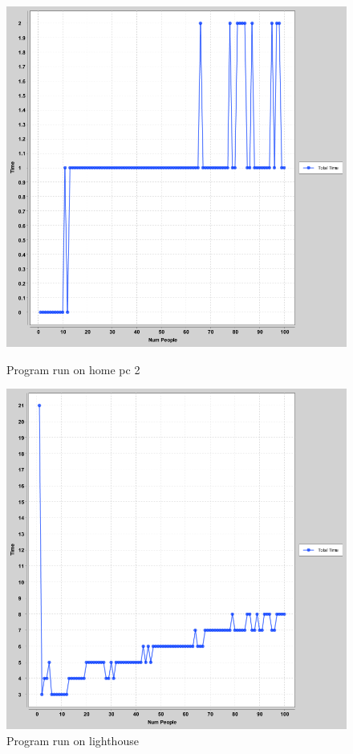 \documentclass[a4paper, 12pt]{article}
\begin{document}
		\begin{figure}[H]
  				\includegraphics[width=\linewidth]{numpeople-vs-time(homepc2)}
  				\caption{Program run on home pc 2}
			\endminipage\hfill
  				\includegraphics[width=\linewidth]{numpeople-vs-time(lighthouse)}
  				\caption{Program run on lighthouse}
				\endminipage\hfill
		\end{figure}
					
\end{document}
